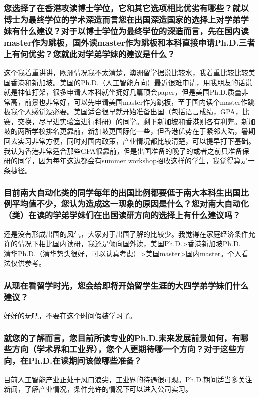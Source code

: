\documentclass[a4paper,UTF8]{book}
\begin{document}
    \subsubsection*{您选择了在香港攻读博士学位，它和其它选项相比优劣有哪些？就以博士为最终学位的学术深造而言您在出国深造国家的选择上对学弟学妹有什么建议？对于以博士学位为最终学位的深造而言，先在国内读master作为跳板，国外读master作为跳板和本科直接申请Ph.D.三者上有何优劣？您就此对学弟学妹的建议是什么？}
    这个我着重讲讲，欧洲情况我不太清楚，澳洲留学据说比较水，我着重比较比较美国香港和新加坡。美国的Ph.D.（人工智能方向）最近很难申请，用我朋友的话说就是神仙打架，很多申请人本科就坐拥好几篇顶会paper，但是美国Ph.D.质量非常高，前景也非常好，可以先申请美国master作为跳板，至于国内读个master作跳板我个人感觉没必要。美国适合很早就开始准备出国（包括语言成绩，GPA，比赛，交换，尽早进实验室进行科研）的同学。剩下新加坡和香港则各有利弊。新加坡的两所学校排名更靠前，新加坡更国际化一些，但香港优势在于紧邻大陆，暑期回去实习非常方便，同时对国内政策，产业情况都比较清楚，可以提早打下基础。
    我认为香港非常适合那些GPA很靠前，但是出国准备的晚了的或者之前只准备保研的同学，因为每年这边都会有summer workshop招收这样的学生，我觉得算是一条捷径。

    \subsubsection*{目前南大自动化类的同学每年的出国比例都要低于南大本科生出国比例平均值不少，您认为造成这一现象的原因是什么？您对南大自动化（类）在读的学弟学妹们在出国读研方向的选择上有什么建议吗？}
    还是没有形成出国的风气，大家对于出国了解的比较少。我觉得在家庭经济条件允许的情况下相比国内读研，我还是倾向国外读，美国Ph.D.>香港新加坡Ph.D. = 清华Ph.D.（清华势头很好，可以认真考虑）>美国master>国内master。个人看法仅供参考。
    
    \subsubsection*{从现在看留学时光，您会给即将开始留学生涯的大四学弟学妹们什么建议？}
    好好的玩吧，不要在这个时间假装学习了。
    
    \subsubsection*{就您的了解而言，您目前所读专业的Ph.D.未来发展前景如何，有哪些方向（学术界和工业界），您个人更期待哪一个方向？对于这些方向，在Ph.D.在读期间该做哪些准备？}
    目前人工智能产业正处于风口浪尖，工业界的待遇很可观。Ph.D.期间适当多关注新闻，了解产业情况，条件允许的情况下可以进入公司实习。
\end{document}
